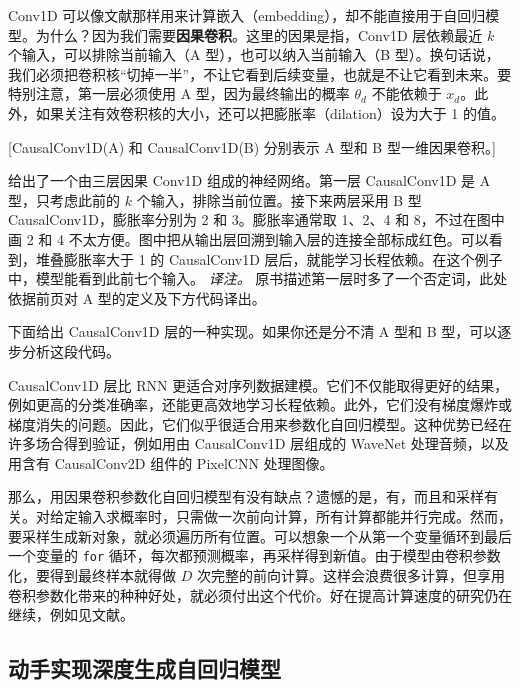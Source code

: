 Conv1D 可以像文献那样用来计算嵌入（embedding），却不能直接用于自回归模型。为什么？因为我们需要\textbf{因果卷积}。这里的因果是指，Conv1D 层依赖最近 $k$ 个输入，可以排除当前输入（A 型），也可以纳入当前输入（B 型）。换句话说，我们必须把卷积核“切掉一半”，不让它看到后续变量，也就是不让它看到未来。要特别注意，第一层必须使用 A 型，因为最终输出的概率 $\theta_d$ 不能依赖于 $x_d$。此外，如果关注有效卷积核的大小，还可以把膨胀率（dilation）设为大于 1 的值。

[CausalConv1D(A) 和 CausalConv1D(B) 分别表示 A 型和 B 型一维因果卷积。]

给出了一个由三层因果 Conv1D 组成的神经网络。第一层 CausalConv1D 是 A 型，只考虑此前的 $k$ 个输入，排除当前位置。接下来两层采用 B 型 CausalConv1D，膨胀率分别为 2 和 3。膨胀率通常取 1、2、4 和 8，不过在图中画 2 和 4 不太方便。图中把从输出层回溯到输入层的连接全部标成红色。可以看到，堆叠膨胀率大于 1 的 CausalConv1D 层后，就能学习长程依赖。在这个例子中，模型能看到此前七个输入。
\emph{译注。} 原书描述第一层时多了一个否定词，此处依据前页对 A 型的定义及下方代码译出。

下面给出 CausalConv1D 层的一种实现。如果你还是分不清 A 型和 B 型，可以逐步分析这段代码。


CausalConv1D 层比 RNN 更适合对序列数据建模。它们不仅能取得更好的结果，例如更高的分类准确率，还能更高效地学习长程依赖。此外，它们没有梯度爆炸或梯度消失的问题。因此，它们似乎很适合用来参数化自回归模型。这种优势已经在许多场合得到验证，例如用由 CausalConv1D 层组成的 WaveNet 处理音频，以及用含有 CausalConv2D 组件的 PixelCNN 处理图像。

那么，用因果卷积参数化自回归模型有没有缺点？遗憾的是，有，而且和采样有关。对给定输入求概率时，只需做一次前向计算，所有计算都能并行完成。然而，要采样生成新对象，就必须遍历所有位置。可以想象一个从第一个变量循环到最后一个变量的 \texttt{for} 循环，每次都预测概率，再采样得到新值。由于模型由卷积参数化，要得到最终样本就得做 $D$ 次完整的前向计算。这样会浪费很多计算，但享用卷积参数化带来的种种好处，就必须付出这个代价。好在提高计算速度的研究仍在继续，例如见文献。

\subsection{动手实现深度生成自回归模型}

